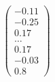 \documentclass[preview]{standalone}
\begin{document}
\begin{align*}
\begin{pmatrix} -0.11 \\ -0.25 \\ 0.17 \\ \dots \\ 0.17 \\ -0.03 \\ 0.8 \end{pmatrix}
\end{align*}
\end{document}
